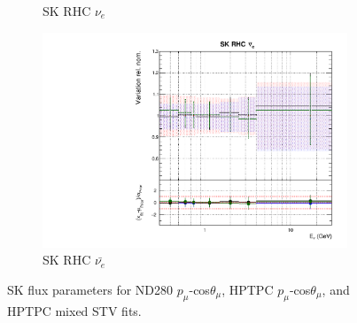 \begin{figure}
\begin{subfigure}{0.45\textwidth}
  \caption{SK RHC $\nu_{e}$}
\end{subfigure}
\begin{subfigure}{0.45\textwidth}
  \centering
  \includegraphics[width=0.75\linewidth]{figs/hptpcfitsflux_15}
  \caption{SK RHC $\bar{\nu_e}$}
\end{subfigure}
\caption{SK flux parameters for ND280 $p_{\mu}$-cos$\theta_{\mu}$, HPTPC $p_{\mu}$-cos$\theta_{\mu}$, and HPTPC mixed STV fits.}
\label{fig:hptpcfluxSK}
\end{figure}

